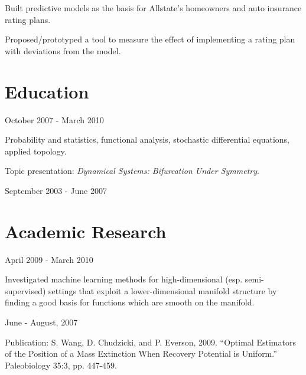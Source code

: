 \documentclass[letterpaper]{resume}
\begin{document}
\begin{compactitem}
\item Built predictive models as the basis for Allstate's homeowners and auto insurance rating plans.
\item Proposed/prototyped a tool to measure the effect of implementing a rating plan with deviations from the model.
\end{compactitem}

\section{Education}

{October 2007 - March 2010}
{}
{}
\begin{compactitem}
\item Probability and statistics, functional analysis, stochastic differential equations, applied topology.
\item Topic presentation: \textit{Dynamical Systems: Bifurcation Under Symmetry}.      
\end{compactitem}


{September 2003 - June 2007}
{}
{}

\section{Academic Research}

{April 2009 - March 2010}
{}
{}
\begin{compactitem}
\item Investigated machine learning methods for 
high-dimensional (esp. semi-supervised) settings that exploit a lower-dimensional manifold structure by finding a good 
basis for functions which are smooth on the manifold.
\end{compactitem}

{June - August, 2007}
{}
{}
\begin{compactitem}

\item Publication: S. Wang, D. Chudzicki, and P. Everson, 2009. ``Optimal Estimators of the Position of a Mass Extinction When Recovery Potential is Uniform.'' Paleobiology 35:3, pp. 447-459. 

\end{compactitem}
\end{document}
